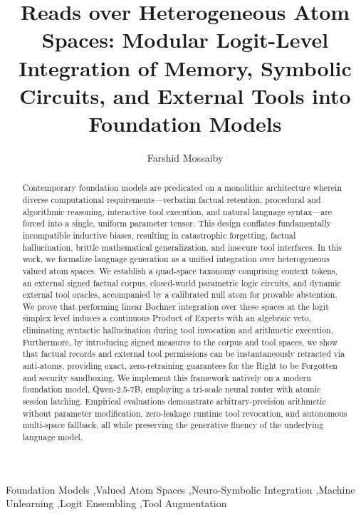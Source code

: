 \documentclass[preprint,12pt]{elsarticle}
\begin{document}
\begin{frontmatter}

\title{Reads over Heterogeneous Atom Spaces: Modular Logit-Level Integration of Memory, Symbolic Circuits, and External Tools into Foundation Models}

\author[ui]{Farshid Mossaiby}

\address[ui]{Department of Civil Engineering, University of Isfahan, 81744-73441 Isfahan, Iran}

\begin{abstract}
Contemporary foundation models are predicated on a monolithic architecture wherein diverse computational requirements—verbatim factual retention, procedural and algorithmic reasoning, interactive tool execution, and natural language syntax—are forced into a single, uniform parameter tensor. This design conflates fundamentally incompatible inductive biases, resulting in catastrophic forgetting, factual hallucination, brittle mathematical generalization, and insecure tool interfaces. In this work, we formalize language generation as a unified integration over heterogeneous valued atom spaces. We establish a quad-space taxonomy comprising context tokens, an external signed factual corpus, closed-world parametric logic circuits, and dynamic external tool oracles, accompanied by a calibrated null atom for provable abstention. We prove that performing linear Bochner integration over these spaces at the logit simplex level induces a continuous Product of Experts with an algebraic veto, eliminating syntactic hallucination during tool invocation and arithmetic execution. Furthermore, by introducing signed measures to the corpus and tool spaces, we show that factual records and external tool permissions can be instantaneously retracted via anti-atoms, providing exact, zero-retraining guarantees for the Right to be Forgotten and security sandboxing. We implement this framework natively on a modern foundation model, Qwen-2.5-7B, employing a tri-scale neural router with atomic session latching. Empirical evaluations demonstrate arbitrary-precision arithmetic without parameter modification, zero-leakage runtime tool revocation, and autonomous multi-space fallback, all while preserving the generative fluency of the underlying language model.
\end{abstract}

\begin{keyword}
Foundation Models \sep Valued Atom Spaces \sep Neuro-Symbolic Integration \sep Machine Unlearning \sep Logit Ensembling \sep Tool Augmentation
\end{keyword}

\end{frontmatter}
\end{document}
